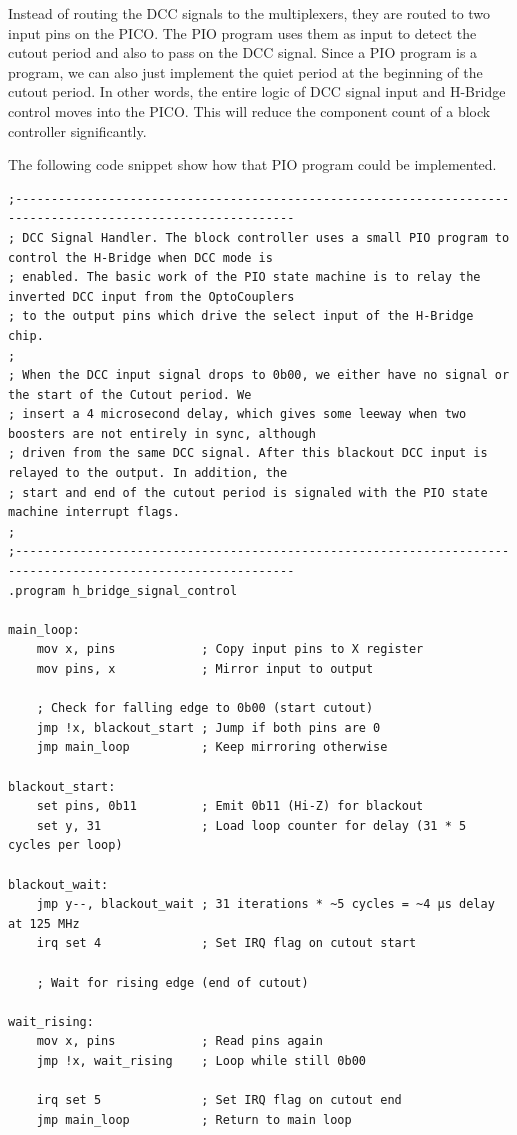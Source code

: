 Instead of routing the DCC signals to the multiplexers, they are routed to two input pins on the PICO. The PIO program uses them as input to detect the cutout period and also to pass on the DCC signal. Since a PIO program is a program, we can also just implement the quiet period at the beginning of the cutout period. In other words, the entire logic of DCC signal input and H-Bridge control moves into the PICO. This will reduce the component count of a block controller significantly.

The following code snippet show how that PIO program could be implemented.

\pagebreak[3] %
\lstset{language=c++, style=codesnippetstyle}
\begin{lstlisting}
;-------------------------------------------------------------------------------------------------------------
; DCC Signal Handler. The block controller uses a small PIO program to control the H-Bridge when DCC mode is
; enabled. The basic work of the PIO state machine is to relay the inverted DCC input from the OptoCouplers
; to the output pins which drive the select input of the H-Bridge chip. 
; 
; When the DCC input signal drops to 0b00, we either have no signal or the start of the Cutout period. We 
; insert a 4 microsecond delay, which gives some leeway when two boosters are not entirely in sync, although
; driven from the same DCC signal. After this blackout DCC input is relayed to the output. In addition, the
; start and end of the cutout period is signaled with the PIO state machine interrupt flags.
;
;-------------------------------------------------------------------------------------------------------------
.program h_bridge_signal_control

main_loop:
    mov x, pins            ; Copy input pins to X register
    mov pins, x            ; Mirror input to output

    ; Check for falling edge to 0b00 (start cutout)
    jmp !x, blackout_start ; Jump if both pins are 0
    jmp main_loop          ; Keep mirroring otherwise

blackout_start:
    set pins, 0b11         ; Emit 0b11 (Hi-Z) for blackout
    set y, 31              ; Load loop counter for delay (31 * 5 cycles per loop)

blackout_wait:
    jmp y--, blackout_wait ; 31 iterations * ~5 cycles = ~4 µs delay at 125 MHz
    irq set 4              ; Set IRQ flag on cutout start

    ; Wait for rising edge (end of cutout)

wait_rising:
    mov x, pins            ; Read pins again
    jmp !x, wait_rising    ; Loop while still 0b00

    irq set 5              ; Set IRQ flag on cutout end
    jmp main_loop          ; Return to main loop
    
\end{lstlisting}

